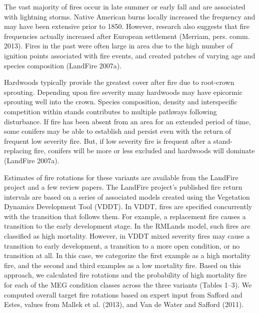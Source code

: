 The vast majority of fires occur in late summer or early fall and are associated with lightning storms. Native American burns locally increased the frequency and may have been extensive prior to 1850. However, research also suggests that fire frequencies actually increased after European settlement (Merriam, pers. comm. 2013). Fires in the past were often large in area due to the high number of ignition points associated with fire events, and created patches of varying age and species composition (LandFire 2007a). 

Hardwoods typically provide the greatest cover after fire due to root-crown sprouting. Depending upon fire severity many hardwoods may have epicormic sprouting well into the crown. Species composition, density and interspecific competition within stands contributes to multiple pathways following disturbance. If fire has been absent from an area for an extended period of time, some conifers may be able to establish and persist even with the return of frequent low severity fire. But, if low severity fire is frequent after a stand-replacing fire, conifers will be more or less excluded and hardwoods will dominate (LandFire 2007a).

Estimates of fire rotations for these variants are available from the LandFire project and a few review papers. The LandFire project’s published fire return intervals are based on a series of associated models created using the Vegetation Dynamics Development Tool (VDDT). In VDDT, fires are specified concurrently with the transition that follows them. For example, a replacement fire causes a transition to the early development stage. In the RMLands model, such fires are classified as high mortality. However, in VDDT mixed severity fires may cause a transition to early development, a transition to a more open condition, or no transition at all. In this case, we categorize the first example as a high mortality fire, and the second and third examples as a low mortality fire. Based on this approach, we calculated fire rotations and the probability of high mortality fire for each of the MEG condition classes across the three variants (Tables 1–3). We computed overall target fire rotations based on expert input from Safford and Estes, values from Mallek et al. (2013), and Van de Water and Safford (2011). 

